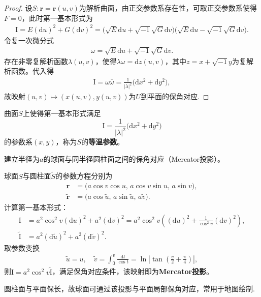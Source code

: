 \documentclass[../../main.tex]{subfiles}%
\begin{document}
\begin{proof}
设$S:\bm r=\bm r(u,v)$为解析曲面，由正交参数系存在性，可取正交参数系使得$F=0$，此时第一基本形式为
\begin{align*}
\mathrm{I}=E(\mathrm{d}u)^2+G(\mathrm{d}v)^2=\big(\sqrt{E}\mathrm{d}u+\sqrt{-1}\sqrt{G}\mathrm{d}v\big)\big(\sqrt{E}\mathrm{d}u-\sqrt{-1}\sqrt{G}\mathrm{d}v\big).
\end{align*}
令复一次微分式
\begin{align}
\omega=\sqrt{E}\mathrm{d}u+\sqrt{-1}\sqrt{G}\mathrm{d}v.
\label{eq:complexdiff}
\end{align}
存在非零复解析函数$\lambda(u,v)$，使得$\lambda\omega=\mathrm{d}z(u,v)$，其中$z= x+\sqrt{-1}y$为复解析函数。代入得
\begin{align*}
\mathrm{I}=\omega\overline{\omega}=\frac{1}{|\lambda|^2}\big(\mathrm{d}x^2+\mathrm{d}y^2\big),
\end{align*}
故映射$(u,v)\mapsto(x(u,v),y(u,v))$为$U$到平面的保角对应.
\end{proof}

\begin{definition}
曲面$S$上使得第一基本形式满足
$$\mathrm{I}=\frac{1}{|\lambda|^2}\big(\mathrm{d}x^2+\mathrm{d}y^2\big)$$
的参数系$(x,y)$，称为$S$的\textbf{等温参数}。
\end{definition}

\begin{example}
建立半径为$a$的球面与同半径圆柱面之间的保角对应（Mercator投影）。
\end{example}
\begin{solution}
球面$S$与圆柱面$\tilde S$的参数方程分别为
\begin{align*}
\bm r&=\big(a\cos v\cos u,\,a\cos v\sin u,\,a\sin v\big),\\
\tilde{\bm r}&=\big(a\cos\tilde u,\,a\sin\tilde u,\,a\tilde v\big).
\end{align*}
计算第一基本形式：
\begin{align*}
\mathrm{I}&=a^2\cos^2v(\mathrm{d}u)^2+a^2(\mathrm{d}v)^2=a^2\cos^2v\left((\mathrm{d}u)^2+\frac{1}{\cos^2v}(\mathrm{d}v)^2\right),\\
\tilde{\mathrm{I}}&=a^2(\mathrm{d}\tilde u)^2+a^2(\mathrm{d}\tilde v)^2.
\end{align*}
取参数变换
\begin{align*}
\tilde u=u,\quad \tilde v=\int_{0}^{v}\frac{\mathrm{d}t}{\cos t}=\ln\left|\tan\left(\frac{v}{2}+\frac{\pi}{4}\right)\right|,
\end{align*}
则$\mathrm{I}=a^2\cos^2v\tilde{\mathrm{I}}$，满足保角对应条件，该映射即为\textbf{Mercator投影}。

圆柱面与平面保长，故球面可通过该投影与平面局部保角对应，常用于地图绘制.

\end{solution}
\end{document}
